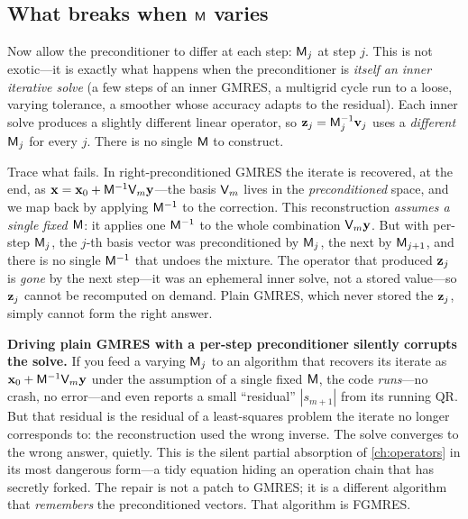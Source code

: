 \subsection{What breaks when $\mathsf{M}$ varies}

Now allow the preconditioner to differ at each step: $\mathsf{M}_j$ at step $j$. This is
not exotic---it is exactly what happens when the preconditioner is \emph{itself an
inner iterative solve} (a few steps of an inner GMRES, a multigrid cycle run to a
loose, varying tolerance, a smoother whose accuracy adapts to the residual). Each
inner solve produces a slightly different linear operator, so $\mathbf{z}_j=\mathsf{M}_j^{-1}
\mathbf{v}_j$ uses a \emph{different} $\mathsf{M}_j$ for every $j$. There is no single $\mathsf{M}$
to construct.

Trace what fails. In right-preconditioned GMRES the iterate is recovered, at the end,
as $\mathbf{x}=\mathbf{x}_0+\mathsf{M}^{-1}\mathsf{V}_m\mathbf{y}$---the basis $\mathsf{V}_m$ lives in the
\emph{preconditioned} space, and we map back by applying $\mathsf{M}^{-1}$ to the
correction. This reconstruction \emph{assumes a single fixed $\mathsf{M}$}: it applies
one $\mathsf{M}^{-1}$ to the whole combination $\mathsf{V}_m\mathbf{y}$. But with per-step
$\mathsf{M}_j$, the $j$-th basis vector was preconditioned by $\mathsf{M}_j$, the next by
$\mathsf{M}_{j+1}$, and there is no single $\mathsf{M}^{-1}$ that undoes the mixture. The
operator that produced $\mathbf{z}_j$ is \emph{gone} by the next step---it was an ephemeral
inner solve, not a stored value---so $\mathbf{z}_j$ cannot be recomputed on demand. Plain
GMRES, which never stored the $\mathbf{z}_j$, simply cannot form the right answer.

\begin{pitfall}
\textbf{Driving plain GMRES with a per-step preconditioner silently corrupts the
solve.} If you feed a varying $\mathsf{M}_j$ to an algorithm that recovers its iterate
as $\mathbf{x}_0+\mathsf{M}^{-1}\mathsf{V}_m\mathbf{y}$ under the assumption of a single fixed $\mathsf{M}$,
the code \emph{runs}---no crash, no error---and even reports a small ``residual''
$|s_{m+1}|$ from its running QR. But that residual is the residual of a least-squares
problem the iterate no longer corresponds to: the reconstruction used the wrong
inverse. The solve converges to the wrong answer, quietly. This is the silent partial
absorption of \cref{ch:operators} in its most dangerous form---a tidy equation hiding
an operation chain that has secretly forked. The repair is not a patch to GMRES; it is
a different algorithm that \emph{remembers} the preconditioned vectors. That algorithm
is FGMRES.
\end{pitfall}


